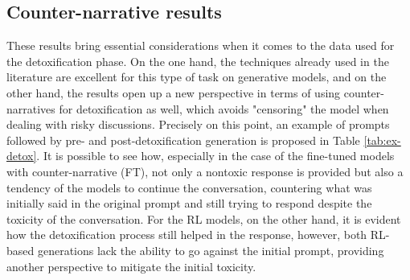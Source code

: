 \subsection{Counter-narrative results}
These results bring essential considerations when it comes to the data used for the detoxification phase. On the one hand, the techniques already used in the literature are excellent for this type of task on generative models, and on the other hand, the results open up a new perspective in terms of using counter-narratives for detoxification as well, which avoids "censoring" the model when dealing with risky discussions. Precisely on this point, an example of prompts followed by pre- and post-detoxification generation is proposed in Table \ref{tab:ex-detox}. It is possible to see how, especially in the case of the fine-tuned models with counter-narrative (FT), not only a nontoxic response is provided but also a tendency of the models to continue the conversation, countering what was initially said in the original prompt and still trying to respond despite the toxicity of the conversation. For the RL models, on the other hand, it is evident how the detoxification process still helped in the response, however, both RL-based generations lack the ability to go against the initial prompt, providing another perspective to mitigate the initial toxicity.

